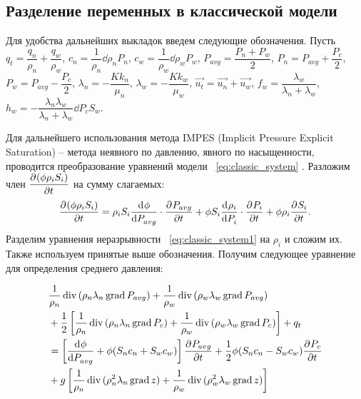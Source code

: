 \subsection{Разделение переменных в классической модели}
\label{var_division}
Для удобства дальнейших выкладок введем следующие обозначения.
Пусть $q_t = \dfrac{q_n}{\rho_n} + \dfrac{q_w}{\rho_w}$,
$c_n = \dfrac{1}{\rho_n} \dd{\rho_n}{P_n}$,
$c_w = \dfrac{1}{\rho_w} \dd{\rho_w}{P_w}$,
$P_{avg} = \dfrac{P_n + P_w}{2}$,
$P_n = P_{avg} + \dfrac{P_c}{2}$,
$P_w = P_{avg} - \dfrac{P_c}{2}$,
$\lambda_n = -\dfrac{K k_n}{\mu_n}$,
$\lambda_w = -\dfrac{K k_w}{\mu_w}$,
$\overrightarrow{u_t} = \overrightarrow{u_n} + \overrightarrow{u_w}$,
$f_w = \dfrac{\lambda_w}{\lambda_n + \lambda_w}$,
$h_w = - \dfrac{\lambda_n\lambda_w}{\lambda_n + \lambda_w} \dd{P_c}{S_w}$.

Для дальнейшего использования метода IMPES (Implicit Pressure Explicit Saturation) -- метода неявного по давлению,
явного по насыщенности, проводится преобразование уравнений модели ~\eqref{eq:classic_system} \cite{Peaceman}.
Разложим член $\dfrac{\partial^{} (\phi \rho_i S_i)}{\partial t^{}}$ на сумму слагаемых:
\begin{equation}
 \dfrac{\partial^{} (\phi \rho_i S_i)}{\partial t^{}} = \rho_i S_i \dfrac{\mathrm d^{} \phi}{\mathrm d P_{avg}^{}} \cdot \dfrac{\partial^{} P_{avg}}{\partial t^{}}
 + \phi S_i \dfrac{\mathrm d^{} \rho_i}{\mathrm d P_i^{}} \cdot \dfrac{\partial^{} P_i}{\partial t^{}} + \phi \rho_i \dfrac{\partial^{} S_i}{\partial t^{}}.
\end{equation}
Разделим уравнения неразрывности ~\eqref{eq:classic_system1} на $\rho_i$ 
и сложим их. Также используем принятые выше обозначения.
Получим следующее уравнение для определения среднего давления:

\begin{equation} \label{eq:classic_pressure}
 \begin{aligned}
  &\frac{1}{\rho_n} \mathop{\mathrm{div}}\nolimits{ (\rho_n\lambda_n\mathop{\mathrm{grad}}\nolimits{ P_{avg}})} + \frac{1}{\rho_w} \mathop{\mathrm{div}}\nolimits{ (\rho_w\lambda_w\mathop{\mathrm{grad}}\nolimits{ P_{avg}})} \\
  & + \frac{1}{2} \left[ \frac{1}{\rho_n} \mathop{\mathrm{div}}\nolimits{ (\rho_n\lambda_n\mathop{\mathrm{grad}}\nolimits{ P_c})} + \frac{1}{\rho_w} \mathop{\mathrm{div}}\nolimits{ (\rho_w\lambda_w\mathop{\mathrm{grad}}\nolimits{ P_c})}\right] + q_t \\
  &  = \left[ \dfrac{\mathrm d^{} \phi}{\mathrm d P_{avg}^{}} + \phi (S_n c_n + S_w c_w) \right] \dfrac{\partial^{} P_{avg}}{\partial t^{}} +
  \frac{1}{2} \phi (S_n c_n - S_w c_w) \dfrac{\partial^{} P_{c}}{\partial t^{}} \\
  & + g \left[ \frac{1}{\rho_n} \mathop{\mathrm{div}}\nolimits{ (\rho_n^2\lambda_n\mathop{\mathrm{grad}}\nolimits{ z})} + \frac{1}{\rho_w} \mathop{\mathrm{div}}\nolimits{ (\rho_w^2\lambda_w\mathop{\mathrm{grad}}\nolimits{ z})} \right]
 \end{aligned}
\end{equation}

